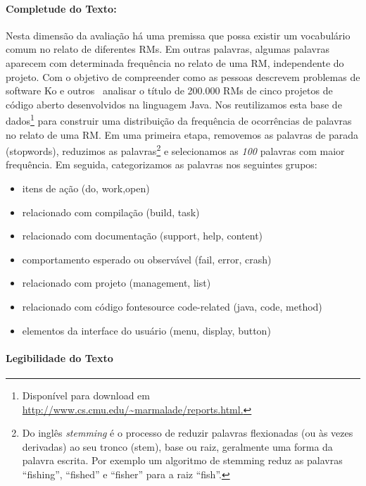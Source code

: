 \paragraph{Completude do Texto:}
\label{par:completude_de_palavras_chaves}

Nesta dimensão da avaliação há uma premissa que possa existir um vocabulário
comum no relato de diferentes RMs. Em outras palavras, algumas palavras aparecem
com determinada frequência no relato de uma RM, independente do projeto. Com o
objetivo de compreender como as pessoas descrevem problemas de software Ko e
outros~\cite{ko2006linguistic} analisar o título de 200.000 RMs de cinco
projetos de código aberto desenvolvidos na linguagem Java. Nos reutilizamos esta
base de dados\footnote{Disponível para download em
    \url{http://www.cs.cmu.edu/~marmalade/reports.html.}} para construir uma
distribuição da frequência de ocorrências de palavras no relato de uma RM\@.  Em
uma primeira etapa, removemos as palavras de parada (stopwords), reduzimos as
palavras\footnote{Do inglês \textit{stemming} é o processo de reduzir palavras
    flexionadas (ou às vezes derivadas) ao seu tronco (stem), base ou raiz,
    geralmente uma forma da palavra escrita. Por exemplo um algoritmo de
    stemming reduz as palavras ``fishing'', ``fished'' e ``fisher'' para a raiz
    ``fish''.} e selecionamos as \textit{100} palavras com maior frequência. Em
seguida, categorizamos as palavras nos seguintes grupos:

\begin{itemize}

    \item itens de ação (do, work,open)
    \item relacionado com compilação (build, task)
    \item relacionado com documentação (support, help, content)
    \item comportamento esperado ou observável (fail, error, crash)
    \item relacionado com projeto (management, list)
    \item relacionado com código fontesource code-related (java, code, method)
    \item elementos da interface do usuário (menu, display, button)

\end{itemize}

\paragraph{Legibilidade do Texto}
\label{par:legibilidade_do_texto}

